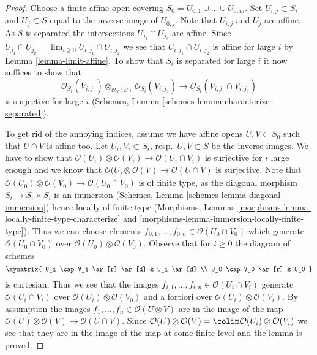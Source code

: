 \begin{proof}
Choose a finite affine open covering
$S_0 = U_{0, 1} \cup \ldots \cup U_{0, m}$.
Set $U_{i, j} \subset S_i$ and $U_j \subset S$
equal to the inverse image of $U_{0, j}$.
Note that $U_{i, j}$ and $U_j$ are affine. As $S$ is separated
the intersections $U_{j_1} \cap U_{j_2}$ are affine. Since
$U_{j_1} \cap U_{j_2} = \lim_{i \geq 0} U_{i, j_1} \cap U_{i, j_2}$
we see that $U_{i, j_1} \cap U_{i, j_2}$ is affine for large $i$
by Lemma \ref{lemma-limit-affine}. To show that $S_i$ is separated
for large $i$ it now suffices to show that
$$
\mathcal{O}_{S_i}(V_{i, j_1})
\otimes_{\mathcal{O}_S(S)}
\mathcal{O}_{S_i}(V_{i, j_2})
\longrightarrow
\mathcal{O}_{S_i}(V_{i, j_1} \cap V_{i, j_2})
$$
is surjective for large $i$
(Schemes, Lemma \ref{schemes-lemma-characterize-separated}).

\medskip\noindent
To get rid of the annoying indices, assume we have affine opens
$U, V \subset S_0$ such that $U \cap V$ is affine too.
Let $U_i, V_i \subset S_i$, resp.\ $U, V \subset S$ be the inverse images.
We have to show that
$\mathcal{O}(U_i) \otimes \mathcal{O}(V_i) \to
\mathcal{O}(U_i \cap V_i)$
is surjective for $i$ large enough and we know that
$\mathcal{O}(U_) \otimes \mathcal{O}(V) \to \mathcal{O}(U \cap V)$
is surjective. Note that
$\mathcal{O}(U_0) \otimes \mathcal{O}(V_0) \to
\mathcal{O}(U_0 \cap V_0)$
is of finite type, as the diagonal morphism $S_i \to S_i \times S_i$
is an immersion (Schemes, Lemma \ref{schemes-lemma-diagonal-immersion})
hence locally of finite type
(Morphisms, Lemmas \ref{morphisms-lemma-locally-finite-type-characterize} and
\ref{morphisms-lemma-immersion-locally-finite-type}).
Thus we can choose elements
$f_{0, 1}, \ldots, f_{0, n} \in \mathcal{O}(U_0 \cap V_0)$
which generate $\mathcal{O}(U_0 \cap V_0)$ over
$\mathcal{O}(U_0) \otimes \mathcal{O}(V_0)$.
Observe that for $i \geq 0$ the diagram of schemes
$$
\xymatrix{
U_i \cap V_i \ar[r] \ar[d] & U_i \ar[d] \\
U_0 \cap V_0 \ar[r] & U_0
}
$$
is cartesian. Thus we see that the images
$f_{i, 1}, \ldots, f_{i, n} \in \mathcal{O}(U_i \cap V_i)$
generate $\mathcal{O}(U_i \cap V_i)$ over
$\mathcal{O}(U_i) \otimes \mathcal{O}(V_0)$
and a fortiori over
$\mathcal{O}(U_i) \otimes \mathcal{O}(V_i)$.
By assumption the images $f_1, \ldots, f_n \in \mathcal{O}(U \otimes V)$
are in the image of the map
$\mathcal{O}(U) \otimes \mathcal{O}(V) \to \mathcal{O}(U \cap V)$.
Since
$\mathcal{O}(U) \otimes \mathcal{O}(V) =
\colim \mathcal{O}(U_i) \otimes \mathcal{O}(V_i)$
we see that they are in the image of the map at some finite level
and the lemma is proved.
\end{proof}

